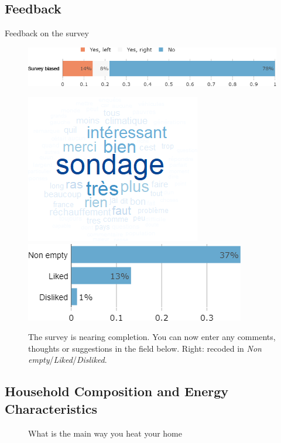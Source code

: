 \begin{framefont}{\small}
\subsection{Feedback}
\begin{frame}{Feedback on the survey}%
\vspace{-.2cm}
\begin{figure}[h!]
\caption{Do you feel that this survey was politically biased?}
\includegraphics[width=.52\paperwidth]{../figures/FR/survey_biased_FR.png} \\
\vspace{.2cm}
\caption{The survey is nearing completion. You can now enter any comments, thoughts or suggestions in the field below. Right: recoded in \textit{Non empty}/\textit{Liked}/\textit{Disliked}.}
\includegraphics[width=.26\paperwidth]{../figures/FR/comment_field_FR.png}
\vspace{.2cm}
\includegraphics[width=.4\paperwidth]{../figures/FR/comment_field_mentions_FR.png}
\end{figure}
\end{frame}



\subsection{Household Composition and Energy Characteristics}
\begin{frame}{}%
\begin{figure}[h!]
\caption{What is the main way you heat your home}


\end{figure}
\end{frame}
\end{framefont}
